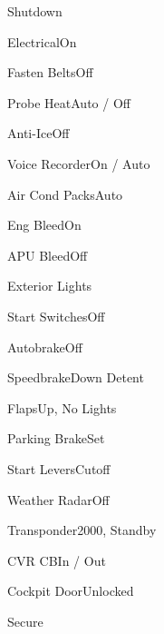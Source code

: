 \documentclass[sim-use, blue_items, halfpage]{checklist}
\begin{document}
\begin{checklist}{Shutdown}
  \item{Electrical}{On \blank}
  \item{Fasten Belts}{Off}
  \item{Probe Heat}{Auto / Off}
  \item{Anti-Ice}{Off}
  \item{Voice Recorder}{On / Auto}
  \item{Air Cond Packs}{Auto}
  \item{Eng Bleed}{On}
  \item{APU Bleed}{Off}
  \item{Exterior Lights}{\blank}
\end{checklist}

\begin{continuedchecklist}
  \item{Start Switches}{Off}
  \item{Autobrake}{Off}
  \item{Speedbrake}{Down Detent}
  \item{Flaps}{Up, No Lights}
  \item{Parking Brake}{Set}
  \item{Start Levers}{Cutoff}
  \item{Weather Radar}{Off}
  \item{Transponder}{2000, Standby}
  \item{CVR CB}{In / Out}
  \item{Cockpit Door}{Unlocked}
\end{continuedchecklist}

\begin{checklist}{Secure}
\end{checklist}

\clearpage
\end{document}
